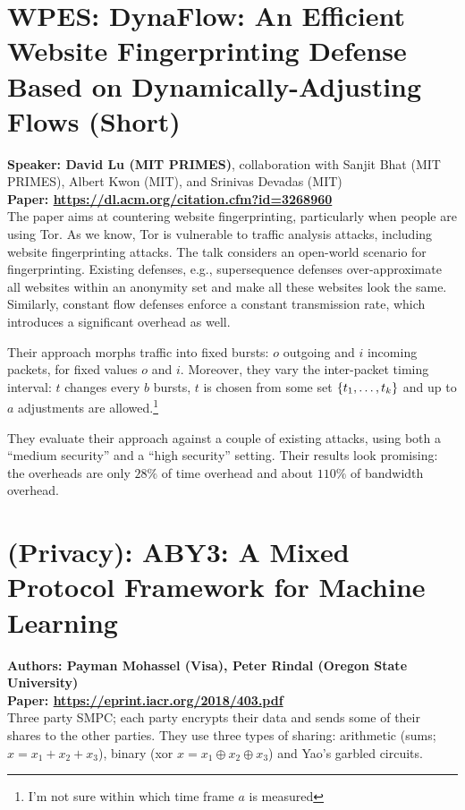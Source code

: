 \documentclass{article}
\begin{document}
\section{WPES: DynaFlow: An Efficient Website Fingerprinting Defense Based on Dynamically-Adjusting Flows (Short)}
\noindent\textbf{Speaker: David Lu (MIT PRIMES)}, collaboration with Sanjit Bhat (MIT PRIMES), Albert Kwon (MIT), and Srinivas Devadas (MIT)\\
\noindent\textbf{Paper: \url{https://dl.acm.org/citation.cfm?id=3268960}}\\

The paper aims at countering website fingerprinting, particularly when people are using Tor. As we know, Tor is vulnerable to traffic analysis attacks, including website fingerprinting attacks. The talk considers an open-world scenario for fingerprinting. Existing defenses, e.g., supersequence defenses over-approximate all websites within an anonymity set and make all these websites look the same. Similarly, constant flow defenses enforce a constant transmission rate, which introduces a significant overhead as well.

Their approach morphs traffic into fixed bursts: $o$ outgoing and $i$ incoming packets, for fixed values $o$ and $i$. Moreover, they vary the inter-packet timing interval: $t$ changes every $b$ bursts, $t$ is chosen from some set $\left\{ t_1, \ldots, t_k \right\}$ and up to $a$ adjustments are allowed.\footnote{I'm not sure within which time frame $a$ is measured}

They evaluate their approach against a couple of existing attacks, using both a ``medium security'' and a ``high security'' setting. Their results look promising: the overheads are only $28\%$ of time overhead and about $110\%$ of bandwidth overhead.


\section{(Privacy): ABY3: A Mixed Protocol Framework for Machine Learning}
\noindent\textbf{Authors: Payman Mohassel (Visa), Peter Rindal (Oregon State University)}\\
\noindent\textbf{Paper: \url{https://eprint.iacr.org/2018/403.pdf}}\\

Three party SMPC; each party encrypts their data and sends some of their shares to the other parties. 
They use three types of sharing: arithmetic (sums; $x = x_1 + x_2 + x_3$), binary (xor $x = x_1 \oplus x_2 \oplus x_3$) and Yao's garbled circuits.
\end{document}
